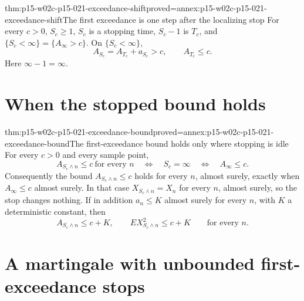 \begin{hblemma}{thm:p15-w02c-p15-021-exceedance-shift}{proved=annex:p15-w02c-p15-021-exceedance-shift}{The first exceedance is one step after the localizing stop}
For every \(c>0\), \(S_c\geq1\), \(S_c\) is a stopping time,
\(S_c-1\) is \(T_c\), and \(\{S_c<\infty\}=\{A_\infty>c\}\).
On \(\{S_c<\infty\}\),
\[
              A_{S_c}=A_{T_c}+a_{S_c}>c,\qquad A_{T_c}\leq c.
\]
Here \(\infty-1=\infty\).
\end{hblemma}

\section{When the stopped bound holds}
\label{sec:p15-w02c-p15-021-bound}

\begin{hbtheorem}{thm:p15-w02c-p15-021-exceedance-bound}{proved=annex:p15-w02c-p15-021-exceedance-bound}{The first-exceedance bound holds only where stopping is idle}
For every \(c>0\) and every sample point,
\[
 A_{S_c\wedge n}\leq c\ \text{for every }n
 \quad\Longleftrightarrow\quad
 S_c=\infty
 \quad\Longleftrightarrow\quad
 A_\infty\leq c .
\]
Consequently the bound \(A_{S_c\wedge n}\leq c\) holds for every
\(n\), almost surely, exactly when \(A_\infty\leq c\) almost surely. In
that case \(X_{S_c\wedge n}=X_n\) for every \(n\), almost surely, so the
stop changes nothing.
If in addition \(a_n\leq K\) almost surely for every \(n\), with \(K\)
a deterministic constant, then
\[
          A_{S_c\wedge n}\leq c+K,\qquad
          EX_{S_c\wedge n}^2\leq c+K\qquad\text{for every }n.
\]
\end{hbtheorem}

\section{A martingale with unbounded first-exceedance stops}
\label{sec:p15-w02c-p15-021-example}

